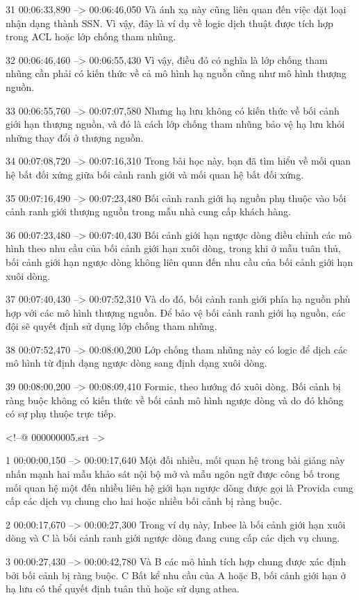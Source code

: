 31
00:06:33,890 --> 00:06:46,050
Và ánh xạ này cũng liên quan đến việc đặt loại nhận dạng thành SSN.  Vì vậy, đây là ví dụ về logic dịch thuật được tích hợp trong ACL hoặc lớp chống tham nhũng.

32
00:06:46,460 --> 00:06:55,430
Vì vậy, điều đó có nghĩa là lớp chống tham nhũng cần phải có kiến ​​thức về cả mô hình hạ nguồn cũng như mô hình thượng nguồn.

33
00:06:55,760 --> 00:07:07,580
Nhưng hạ lưu không có kiến ​​thức về bối cảnh giới hạn thượng nguồn, và đó là cách lớp chống tham nhũng bảo vệ hạ lưu khỏi những thay đổi ở thượng nguồn.

34
00:07:08,720 --> 00:07:16,310
Trong bài học này, bạn đã tìm hiểu về mối quan hệ bất đối xứng giữa bối cảnh ranh giới và mối quan hệ bất đối xứng.

35
00:07:16,490 --> 00:07:23,480
Bối cảnh ranh giới hạ nguồn phụ thuộc vào bối cảnh ranh giới thượng nguồn trong mẫu nhà cung cấp khách hàng.

36
00:07:23,480 --> 00:07:40,430
Bối cảnh giới hạn ngược dòng điều chỉnh các mô hình theo nhu cầu của bối cảnh giới hạn xuôi dòng, trong khi ở mẫu tuân thủ, bối cảnh giới hạn ngược dòng không liên quan đến nhu cầu của bối cảnh giới hạn xuôi dòng.

37
00:07:40,430 --> 00:07:52,310
Và do đó, bối cảnh ranh giới phía hạ nguồn phù hợp với các mô hình thượng nguồn.  Để bảo vệ bối cảnh ranh giới hạ nguồn, các đội sẽ quyết định sử dụng lớp chống tham nhũng.

38
00:07:52,470 --> 00:08:00,200
Lớp chống tham nhũng này có logic để dịch các mô hình từ định dạng ngược dòng sang định dạng xuôi dòng.

39
00:08:00,200 --> 00:08:09,410
Formic, theo hướng đó xuôi dòng.  Bối cảnh bị ràng buộc không có kiến ​​thức về bối cảnh mô hình ngược dòng và do đó không có sự phụ thuộc trực tiếp.

<!--@ 000000005.srt -->

1
00:00:00,150 --> 00:00:17,640
Một đối nhiều, mối quan hệ trong bài giảng này nhấn mạnh hai mẫu khảo sát nội bộ mở và mẫu ngôn ngữ được công bố trong mối quan hệ một đến nhiều liên hệ giới hạn ngược dòng được gọi là Provida cung cấp các dịch vụ chung cho hai hoặc nhiều bối cảnh bị ràng buộc.

2
00:00:17,670 --> 00:00:27,300
Trong ví dụ này, Inbee là bối cảnh giới hạn xuôi dòng và C là bối cảnh ranh giới ngược dòng đang cung cấp các dịch vụ chung.

3
00:00:27,430 --> 00:00:42,780
Và B các mô hình tích hợp chung được xác định bởi bối cảnh bị ràng buộc.  C Bất kể nhu cầu của A hoặc B, bối cảnh giới hạn ở hạ lưu có thể quyết định tuân thủ hoặc sử dụng athea.


